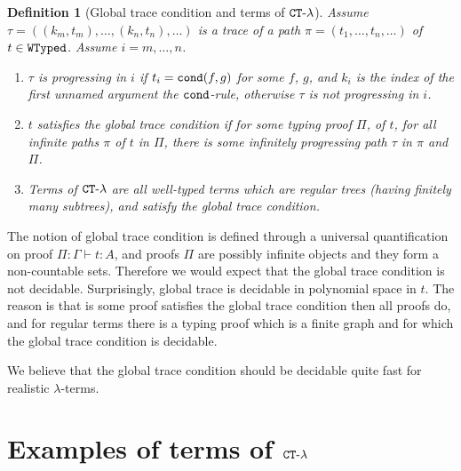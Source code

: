 \documentclass{article}
\newtheorem{definition}[theorem]{Definition}
\begin{document}
\begin{definition}[Global trace condition and terms of ${ {\tt CT} \mbox{-} \lambda}$]
Assume $\tau =( (k_m,t_m), \ldots, (k_n,t_n), \ldots)$ 
is a trace of a path $\pi = (t_1, \ldots, t_n, \ldots)$ of $t \in {\tt WTyped}$. Assume $i=m,\ldots, n$.
\begin{enumerate}
\item
$\tau$ is progressing in $i$ if $t_i={\tt cond}(f,g)$ for some $f$, $g$,
and $k_i$ is the index of the first \emph{unnamed} argument the ${\tt cond}$-rule, 
otherwise $\tau$ is not progressing in $i$.

\item
$t$ satisfies the global trace condition if for some typing proof $\Pi$,
of $t$, for all infinite paths $\pi$ of $t$ in $\Pi$,
there is some infinitely progressing path $\tau$ in $\pi$ and $\Pi$.

\item
Terms of ${ {\tt CT} \mbox{-} \lambda}$ are all well-typed terms which are regular trees (having finitely many subtrees), 
and satisfy the global trace condition.

\end{enumerate}
\end{definition}

The notion of global trace condition is defined through a universal quantification on proof 
$\Pi:\Gamma \vdash t:A$, and proofs $\Pi$ are possibly infinite objects and they form 
a non-countable sets.
Therefore we would expect that the global trace condition is not decidable. 
Surprisingly, global trace is decidable in polynomial space in $t$. The reason is that is some proof satisfies
the global trace condition then all proofs do, and for regular terms there is a typing proof
which is a finite graph and for which the global trace condition is decidable.

We believe that the global trace condition should be decidable quite fast
for realistic $\lambda$-terms.


\section{Examples of terms of ${ {\tt CT} \mbox{-} \lambda}$}
\end{document}
